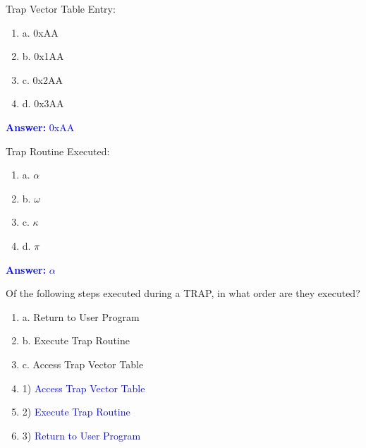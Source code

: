 \documentclass{article}
\begin{document}
\begin{enumerate}[label=(\alph*)]
\begin{center}
\begin{tabular}{|p{3cm} p{3cm} |}
\end{tabular}



\end{center}

Trap Vector Table Entry:

\begin{enumerate}[label={}]
    \item a. 0xAA
    \item b. 0x1AA
    \item c. 0x2AA
    \item d. 0x3AA

    \end{enumerate}

\textcolor{blue}{\textbf{Answer: } 0xAA}

Trap Routine Executed:

\begin{enumerate}[label={}]
    \item a. $\alpha$ 
    \item b. $\omega$
    \item c. $\kappa$
    \item d. $\pi$
\end{enumerate}

\textcolor{blue}{\textbf{Answer: } $\alpha$}

Of the following steps executed during a TRAP, in what order are they executed?
\begin{enumerate}[label={}]
    
\item a. Return to User Program
\item b. Execute Trap Routine
\item c. Access Trap Vector Table
\newline
\item 1) \textcolor{blue}{Access Trap Vector Table}
\item 2) \textcolor{blue}{Execute Trap Routine}
\item 3) \textcolor{blue}{Return to User Program}

\end{enumerate}
\end{enumerate}
\end{document}
